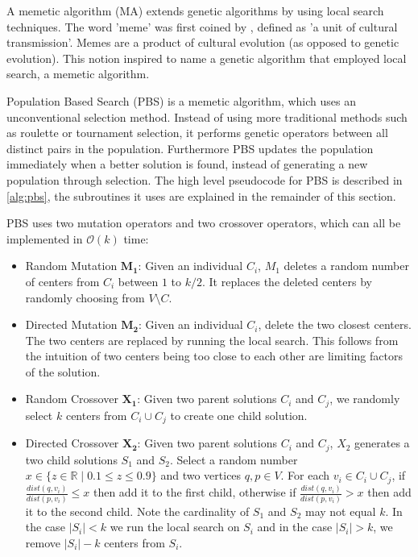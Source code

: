 A memetic algorithm (MA) extends genetic algorithms by using local search techniques. The word 'meme' was first coined by \textcite{dawkins_selfish_1976}, defined as 'a unit of cultural transmission'. Memes are a product of cultural evolution (as opposed to genetic evolution). This notion inspired \textcite{moscato_evolution_1989} to name a genetic algorithm that employed local search, a memetic algorithm.

Population Based Search (PBS) is a memetic algorithm, which uses an unconventional selection method. Instead of using more traditional methods such as roulette or tournament selection, it performs genetic operators between all distinct pairs in the population. Furthermore PBS updates the population immediately when a better solution is found, instead of generating a new population through selection. The high level pseudocode for PBS is described in \cref{alg:pbs}, the subroutines it uses are explained in the remainder of this section.



PBS uses two mutation operators and two crossover operators, which can all be implemented in $\mathcal{O}(k)$ time:
\begin{itemize}
    \item Random Mutation $\mathbf{M_1}$: Given an individual $C_i$, $M_1$ deletes a random number of centers from $C_i$ between $1$ to $k/2$. It replaces the deleted centers by randomly choosing from $V\setminus C$.
    \item Directed Mutation $\mathbf{M_2}$: Given an individual $C_i$, delete the two closest centers. The two centers are replaced by running the local search. This follows from the intuition of two centers being too close to each other are limiting factors of the solution. 
    \item Random Crossover $\mathbf{X_1}$: Given two parent solutions $C_i$ and $C_j$, we randomly select $k$ centers from $C_i\cup C_j$ to create one child solution.
    \item Directed Crossover $\mathbf{X_2}$: Given two parent solutions $C_i$ and $C_j$, $X_2$ generates a two child solutions $S_1$ and $S_2$. Select a random number $x\in\{z\in\mathbb{R}\mid 0.1\leq z\leq 0.9\}$ and two vertices $q,p\in V$. For each $v_i\in C_i\cup C_j$, if $\frac{dist(q, v_i)}{dist(p, v_i)}\leq x$ then add it to the first child, otherwise if $\frac{dist(q, v_i)}{dist(p, v_i)}>x$ then add it to the second child. Note the cardinality of $S_1$ and $S_2$ may not equal $k$. In the case $|S_i|<k$ we run the local search on $S_i$ and in the case $|S_i|>k$, we remove $|S_i|-k$ centers from $S_i$.
\end{itemize}

